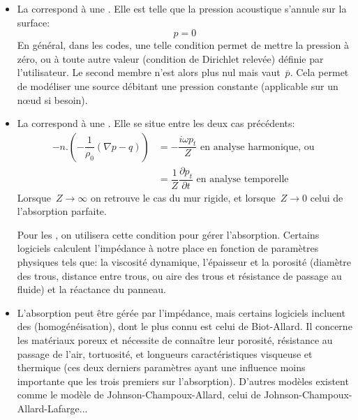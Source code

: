 {\begin{itemize}
   \item La  correspond à une . Elle est telle que la pression acoustique s'annule sur la surface:
   \begin{equation}
   p=0
   \end{equation}
   En général, dans les codes, une telle condition permet de mettre la pression à zéro, ou à toute autre valeur (condition de Dirichlet relevée) définie par l'utilisateur. Le second membre n'est alors plus nul mais vaut~$\overline{p}$. Cela permet de modéliser une source débitant une pression constante (applicable sur un nœud si besoin).
   
   \item La  correspond à une . Elle se situe entre les deux cas précédents:
   \begin{equation}
   \begin{array}{rll}
   -n.\left(-\dfrac1{\rho_0}(\nabla p-q)\right)
   &=-\dfrac{i\omega p_t}{Z} \text{ en analyse harmonique, ou }\\
   &=\dfrac{1}{Z}\dfrac{\partial p_t}{\partial t} \text{ en analyse temporelle}   
   \end{array}
   \end{equation}
   Lorsque~$Z\rightarrow\infty$ on retrouve le cas du mur rigide, et lorsque~$Z\rightarrow0$ celui de l'absorption parfaite.
   
   Pour les , on utilisera cette condition pour gérer l'absorption. Certains logiciels calculent l'impédance à notre place en fonction de paramètres physiques tels que: la viscosité dynamique, l'épaisseur et la porosité (diamètre des trous, distance entre trous, ou aire des trous et résistance de passage au fluide) et la réactance du panneau.
   
   \item L'absorption peut être gérée par l'impédance, mais certains logiciels incluent des  (homogénéisation), dont le plus connu est celui de Biot-Allard. Il concerne les matériaux poreux et nécessite de connaître leur porosité, résistance au passage de l'air, tortuosité, et longueurs caractéristiques visqueuse et thermique (ces deux derniers paramètres ayant une influence moins importante que les trois premiers sur l'absorption). D'autres modèles existent comme le modèle de Johnson-Champoux-Allard, celui de Johnson-Champoux-Allard-Lafarge...
   

\end{itemize}}
